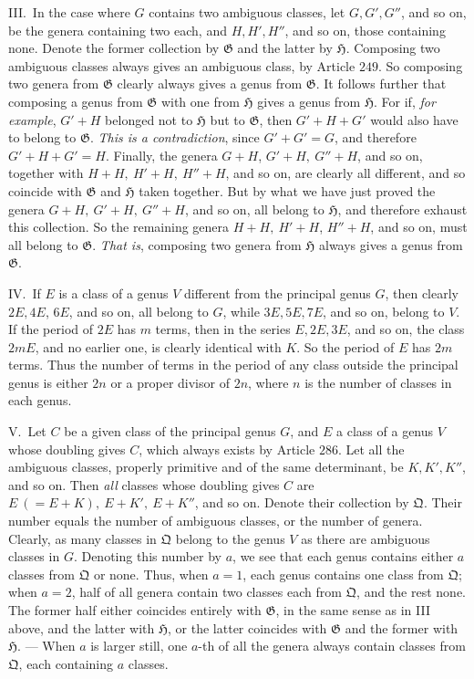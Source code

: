 III.\ In the case where \(G\) contains two ambiguous classes, let \(G,G',G''\), and so on, be the genera containing two each, and \(H,H',H''\), and so on, those containing none. Denote the former collection by \(\mathfrak G\) and the latter by \(\mathfrak H\). Composing two ambiguous classes always gives an ambiguous class, by Article \(249\). So composing two genera from \(\mathfrak G\) clearly always gives a genus from \(\mathfrak G\). It follows further that composing a genus from \(\mathfrak G\) with one from \(\mathfrak H\) gives a genus from \(\mathfrak H\). For if, \textit{for example}, \(G'+H\) belonged not to \(\mathfrak H\) but to \(\mathfrak G\), then \(G'+H+G'\) would also have to belong to \(\mathfrak G\). \textit{This is a contradiction}, since \(G'+G'=G\), and therefore \(G'+H+G'=H\). Finally, the genera \(G+H\), \(G'+H,\ G''+H\), and so on, together with \(H+H,\ H'+H,\ H''+H\), and so on, are clearly all different, and so coincide with \(\mathfrak G\) and \(\mathfrak H\) taken together. But by what we have just proved the genera \(G+H,\ G'+H,\ G''+H\), and so on, all belong to \(\mathfrak H\), and therefore exhaust this collection. So the remaining genera \(H+H,\ H'+H\), \(H''+H\), and so on, must all belong to \(\mathfrak G\). \textit{That is}, composing two genera from \(\mathfrak H\) always gives a genus from \(\mathfrak G\).

IV.\ If \(E\) is a class of a genus \(V\) different from the principal genus \(G\), then clearly \(2E,4E\), \(6E\), and so on, all belong to \(G\), while \(3E,5E,7E\), and so on, belong to \(V\). If the period of \(2E\) has \(m\) terms, then in the series \(E,2E,3E\), and so on, the class \(2mE\), and no earlier one, is clearly identical with \(K\). So the period of \(E\) has \(2m\) terms. Thus the number of terms in the period of any class outside the principal genus is either \(2n\) or a proper divisor of \(2n\), where \(n\) is the number of classes in each genus.

V.\ Let \(C\) be a given class of the principal genus \(G\), and \(E\) a class of a genus \(V\) whose doubling gives \(C\), which always exists by Article \(286\). Let all the ambiguous classes, properly primitive and of the same determinant, be \(K,K',K''\), and so on. Then \textit{all} classes whose
doubling gives \(C\) are \(E\ (=E+K),\ E+K',\ E+K''\), and so on. Denote their collection by \(\mathfrak Q\). Their number equals the number of ambiguous classes, or the number of genera. Clearly, as many classes in \(\mathfrak Q\) belong to the genus \(V\) as there are ambiguous classes in \(G\). Denoting this number by \(a\), we see that each genus contains either \(a\) classes from \(\mathfrak Q\) or none. Thus, when \(a=1\), each genus contains one class from \(\mathfrak Q\); when \(a=2\), half of all genera contain two classes each from \(\mathfrak Q\), and the rest none. The former half either coincides entirely with \(\mathfrak G\), in the same sense as in III above, and the latter with \(\mathfrak H\), or the latter coincides with \(\mathfrak G\) and the former with \(\mathfrak H\). — When \(a\) is larger still, one \(a\)-th of all the genera always contain classes from \(\mathfrak Q\), each containing \(a\) classes.

